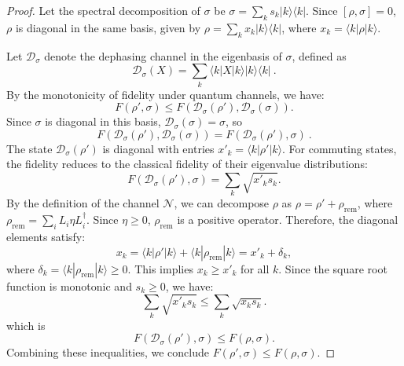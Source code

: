 \documentclass[11pt,letterpaper]{article}
\begin{document}
\begin{proof}
Let the spectral decomposition of $\sigma$ be $\sigma = \sum_k s_k |k\rangle\langle k|$. Since $[\rho, \sigma] = 0$, $\rho$ is diagonal in the same basis, given by $\rho = \sum_k x_k |k\rangle\langle k|$, where $x_k = \langle k | \rho | k \rangle$.

Let $\mathcal{D}_\sigma$ denote the dephasing channel in the eigenbasis of $\sigma$, defined as 
\begin{equation}
    \mathcal{D}_\sigma(X) = \sum_k \langle k | X | k \rangle |k\rangle\langle k|\ .
\end{equation}
By the monotonicity of fidelity under quantum channels, we have:
\begin{equation}
    F(\rho', \sigma) \leq F(\mathcal{D}_\sigma(\rho'), \mathcal{D}_\sigma(\sigma)).
\end{equation}
Since $\sigma$ is diagonal in this basis, $\mathcal{D}_\sigma(\sigma) = \sigma$, so
\begin{equation}
    F(\mathcal{D}_\sigma(\rho'), \mathcal{D}_\sigma(\sigma)) = F(\mathcal{D}_\sigma(\rho'), \sigma)\ .
\end{equation}
The state $\mathcal{D}_\sigma(\rho')$ is diagonal with entries $x'_k = \langle k | \rho' | k \rangle$. For commuting states, the fidelity reduces to the classical fidelity of their eigenvalue distributions:
\begin{equation}
    F(\mathcal{D}_\sigma(\rho'), \sigma) = \sum_k \sqrt{x'_k s_k}.
\end{equation}
By the definition of the channel $\mathcal{N}$, we can decompose $\rho$ as $\rho = \rho' + \rho_{\text{rem}}$, where $\rho_{\text{rem}} = \sum_i L_i \eta L_i^\dagger$. Since $\eta \geq 0$, $\rho_{\text{rem}}$ is a positive operator. Therefore, the diagonal elements satisfy:
\begin{equation}
    x_k = \langle k | \rho' | k \rangle + \langle k | \rho_{\text{rem}} | k \rangle = x'_k + \delta_k,
\end{equation}
where $\delta_k = \langle k | \rho_{\text{rem}} | k \rangle \geq 0$. This implies $x_k \geq x'_k$ for all $k$. Since the square root function is monotonic and $s_k \geq 0$, we have:
\begin{equation}
    \sum_k \sqrt{x'_k s_k} \leq \sum_k \sqrt{x_k s_k}.
\end{equation}
which is
\begin{equation}
    F(\mathcal{D}_\sigma(\rho'), \sigma) \leq  F(\rho, \sigma).
\end{equation}
Combining these inequalities, we conclude $F(\rho', \sigma) \leq F(\rho, \sigma)$.
\end{proof}
\end{document}
